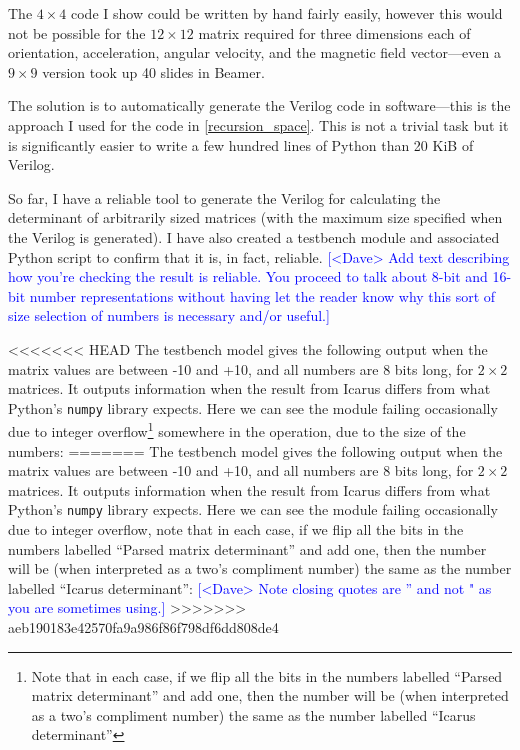 \documentclass[12pt]{article}
\newcommand{\note}[2][red]{\textcolor{#1}{#2}}
\newcommand{\notedme}[1]{\note[blue]{[<Dave> #1]}}
\begin{document}
The $4\times4$ code I show could be written by hand fairly easily, however this would not be possible for the $12\times12$ matrix required for three dimensions each of orientation, acceleration, angular velocity, and the magnetic field vector---even a $9\times9$ version took up 40 slides in Beamer.

The solution is to automatically generate the Verilog code in software---this is the approach I used for the code in \ref{recursion_space}. This is not a trivial task but it is significantly easier to write a few hundred lines of Python than 20 KiB of Verilog.

So far, I have a reliable tool to generate the Verilog for calculating the determinant of arbitrarily sized matrices (with the maximum size specified when the Verilog is generated). I have also created a testbench module and associated Python script to confirm that it is, in fact, reliable.
\notedme{Add text describing how you're checking the result is reliable. You proceed to talk about 8-bit and 16-bit number representations without having let the reader know why this sort of size selection of numbers is necessary and/or useful.}

<<<<<<< HEAD
The testbench model gives the following output when the matrix values are between -10 and +10, and all numbers are 8 bits long, for $2\times2$ matrices. It outputs information when the result from Icarus differs from what Python's \lstinline|numpy| library expects. Here we can see the module failing occasionally due to integer overflow\footnote{Note that in each case, if we flip all the bits in the numbers labelled ``Parsed matrix determinant'' and add one, then the number will be (when interpreted as a two's compliment number) the same as the number labelled ``Icarus determinant''} somewhere in the operation, due to the size of the numbers:
=======
The testbench model gives the following output when the matrix values are between -10 and +10, and all numbers are 8 bits long, for $2\times2$ matrices. It outputs information when the result from Icarus differs from what Python's \lstinline|numpy| library expects. Here we can see the module failing occasionally due to integer overflow, note that in each case, if we flip all the bits in the numbers labelled ``Parsed matrix determinant'' and add one, then the number will be (when interpreted as a two's compliment number) the same as the number labelled ``Icarus determinant'': \notedme{Note closing quotes are '' and not " as you are sometimes using.}
>>>>>>> aeb190183e42570fa9a986f86f798df6dd808de4
\end{document}
